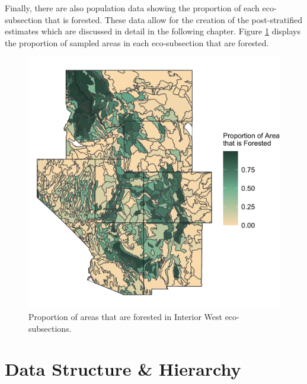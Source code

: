 \documentclass[12pt,twoside]{reedthesis}
\begin{document}
Finally, there are also population data showing the proportion of each eco-subsection that is forested. These data allow for the creation of the post-stratified estimates which are discussed in detail in the following chapter. Figure \ref{fig:strata-plot} displays the proportion of sampled areas in each eco-subsection that are forested.
\begin{figure}

{\centering \includegraphics[width=0.65\linewidth]{figure/strata_plot} 

}

\caption[Proportion of areas that are forested in Interior West eco-subsections]{Proportion of areas that are forested in Interior West eco-subsections.}\label{fig:strata-plot}
\end{figure}
\clearpage

\hypertarget{data-structure-hierarchy}{%
\section{Data Structure \& Hierarchy}\label{data-structure-hierarchy}}
\end{document}
